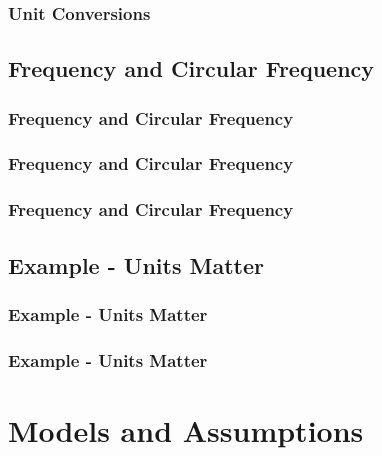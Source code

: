 \documentclass[fleqn]{beamer} %
\newcommand{\sectionIIItitle}{Models and Assumptions}
\newcommand{\sectionIIsubsectionIItitle}{Unit Conversions}
\newcommand{\sectionIIsubsectionIIItitle}{Frequency and Circular Frequency}
\newcommand{\sectionIIsubsectionIVtitle}{Example - Units Matter}
\newcommand{\btVFill}{\vskip0pt plus 1filll}
\begin{document}
			\begin{frame}
				\frametitle{\sectionIIsubsectionIItitle}
		

			\end{frame}

		\subsection{\sectionIIsubsectionIIItitle}\label{sectionIIsubsectionIII}

			\begin{frame}
				\frametitle{\sectionIIsubsectionIIItitle}
		

			\end{frame}

			\begin{frame}
				\frametitle{\sectionIIsubsectionIIItitle}
		

			\end{frame}

			\begin{frame}
				\frametitle{\sectionIIsubsectionIIItitle}
		

			\end{frame}

		\subsection{\sectionIIsubsectionIVtitle}\label{sectionIIsubsectionIV}

			\begin{frame}
				\frametitle{\sectionIIsubsectionIVtitle}
		

			\end{frame}

			\begin{frame}
				\frametitle{\sectionIIsubsectionIVtitle}
		

			\end{frame}
		
	\section{\sectionIIItitle}\label{sectionIII}
\end{document}

